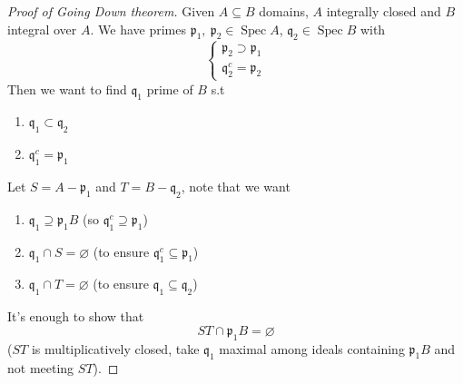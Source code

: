 \documentclass[11pt,a4paper]{article}
\theoremstyle{definition}
\theoremstyle{plain}
\theoremstyle{remark}
\newcommand{\Spec}{\operatorname{Spec}}
\begin{document}
\begin{proof}[Proof of Going Down theorem]
    Given $A \subseteq B$ domains, $A$ integrally closed and $B$ integral over $A$. We have primes $\mathfrak{p}_1, \ \mathfrak{p}_2 \in \Spec A$, 
    $\mathfrak{q}_2 \in \Spec B$ with 
    $$\begin{cases}
        \mathfrak{p}_2 \supset \mathfrak{p}_1 \\
        \mathfrak{q}_2^c = \mathfrak{p}_2
    \end{cases}$$
    Then we want to find $\mathfrak{q}_1$ prime of $B$ s.t 
    \begin{enumerate}
        \item $\mathfrak{q}_1 \subset \mathfrak{q}_2$ 
        \item $\mathfrak{q}_1^c = \mathfrak{p}_1$
    \end{enumerate}
    
    Let $S = A - \mathfrak{p}_1$ and $T = B- \mathfrak{q}_2$, note that we want 
    \begin{enumerate}[label = (\roman*)]
        \item $\mathfrak{q}_1 \supseteq \mathfrak{p}_1 B$ (so $\mathfrak{q}_1^c \supseteq \mathfrak{p}_1$)
        \item $\mathfrak{q}_1 \cap S = \varnothing$ (to ensure $\mathfrak{q}_1^c \subseteq \mathfrak{p}_1$)
        \item $\mathfrak{q}_1 \cap T = \varnothing$ (to ensure $\mathfrak{q}_1 \subseteq \mathfrak{q}_2$)
    \end{enumerate} 
    It's enough to show that 
    $$ST \cap \mathfrak{p}_1 B = \varnothing$$
    ($ST$ is multiplicatively closed, take $\mathfrak{q}_1$ maximal among ideals containing $\mathfrak{p}_1B$ and not meeting $ST$). 
    

\end{proof}
\end{document}
